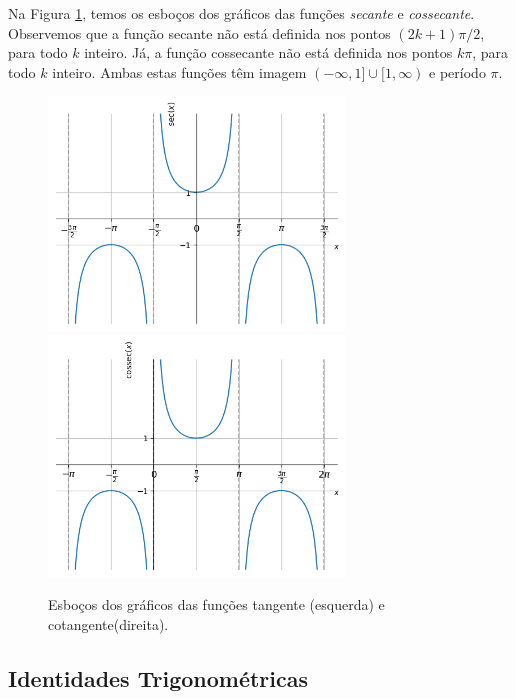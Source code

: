 Na Figura \ref{fig:co_sec_graficos}, temos os esboços dos gráficos das funções \emph{secante} e \emph{cossecante}. Observemos que a função secante não está definida nos pontos $(2k+1)\pi/2$, para todo $k$ inteiro. Já, a função cossecante não está definida nos pontos $k\pi$, para todo $k$ inteiro. Ambas estas funções têm imagem $(-\infty, 1]\cup [1, \infty)$ e período $\pi$.

\begin{figure}[H]
  \centering
  \includegraphics[width=0.7\textwidth]{./cap_funcao/dados/fig_co_sec_graficos/fig_sec_grafico}\\
  \includegraphics[width=0.7\textwidth]{./cap_funcao/dados/fig_co_sec_graficos/fig_cosec_grafico}
  \caption{Esboços dos gráficos das funções tangente (esquerda) e cotangente(direita).}
  \label{fig:co_sec_graficos}
\end{figure}

\subsection{Identidades Trigonométricas}

